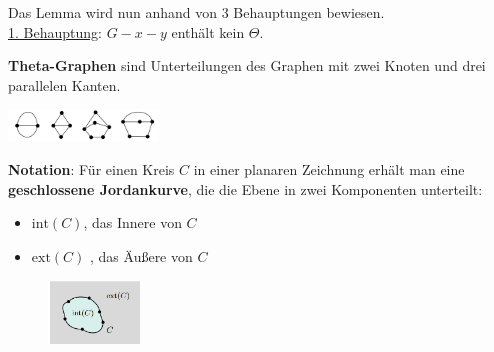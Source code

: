 Das Lemma wird nun anhand von 3 Behauptungen bewiesen.\\

\underline{1. Behauptung}: $G-x-y$ enthält kein $\Theta$.

\textbf{Theta-Graphen} sind Unterteilungen des Graphen mit zwei Knoten und drei parallelen Kanten.
\begin{center}
	\includegraphics[width=0.3\textwidth]{images/theta.png}
\end{center}
\pagebreak


\textbf{Notation}: Für einen Kreis $C$ in einer planaren Zeichnung erhält man eine \textbf{geschlossene Jordankurve}, die die Ebene in zwei Komponenten unterteilt:
\begin{itemize}
	\item $\text{int}(C)$, das Innere von $C$
	\item $\text{ext}(C)$ , das Äußere von $C$
\end{itemize}
\begin{figure}
	\centering
	\vspace{-70pt}
	\includegraphics[width=0.22\textwidth]{images/jordan.png}
	\vspace{40pt}
	\vspace{-60pt}
\end{figure}

